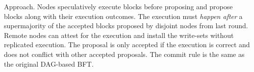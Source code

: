Approach.
Nodes speculatively execute blocks before proposing and propose blocks along with their execution outcomes.
The execution must \emph{happen after} a supermajority of the accepted blocks proposed by disjoint nodes from last round.
Remote nodes can attest for the execution and install the write-sets without replicated execution.
The proposal is only accepted if the execution is correct and does not conflict with other accepted proposals.
The commit rule is the same as the original DAG-based BFT.

